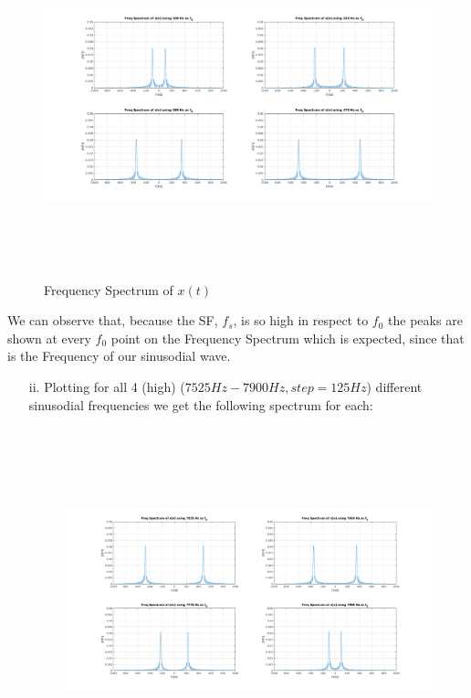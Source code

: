 \documentclass[12pt, a4paper]{article}
\begin{document}
\begin{enumerate}
\begin{enumerate}
\begin{figure}[H]
            \includegraphics[width=\textwidth, height=10cm]{3_B_1.png}
            \caption{Frequency Spectrum of \(x(t)\)}
        \end{figure}
    \end{enumerate}
    We can observe that, because the SF, \(f_s\), is so high in respect to \(f_0\) the peaks are shown at every \(f_0\)
    point on the Frequency Spectrum which is expected, since that is the Frequency of our sinusodial wave.
    \pagebreak
    \begin{enumerate}
        \item[ii.]Plotting for all 4 (high) (\(7525Hz - 7900Hz, step=125Hz\)) different sinusodial frequencies we get the following spectrum for each:   
        \begin{figure}[H]
            \centering
            \includegraphics[width=\textwidth, height=10cm]{3_B_2.png}

\end{figure}
\end{enumerate}
\end{enumerate}
\end{document}
